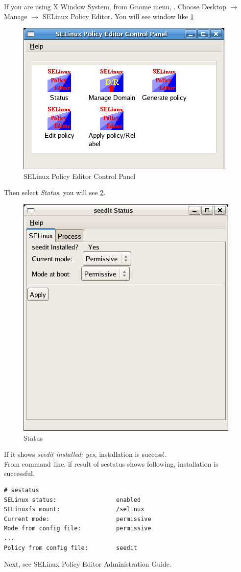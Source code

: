 \documentclass{article}
\begin{document}
If you are using X Window System,  from  Gnome menu, 
. Choose Desktop $\rightarrow$ Manage $\rightarrow$ SELinux
Policy Editor.
You will see window like \ref{fig:controlpanel}
\begin{figure}
\caption{SELinux Policy Editor Control Panel}\label{fig:controlpanel}
\includegraphics*{images/controlpanel.png}
\end{figure}

Then  select {\it Status}, you will see \ref{fig:status-selinux}.
\begin{figure}
\caption{Status}\label{fig:status-selinux}
\includegraphics{images/status-selinux.png}
\end{figure}
If it shows {\it seedit installed: yes}, installation is success!.\\

From command line, if result of sestatus shows following, installation
is successful.
\begin{verbatim}
# sestatus
SELinux status:                 enabled
SELinuxfs mount:                /selinux
Current mode:                   permissive
Mode from config file:          permissive
...
Policy from config file:        seedit	
\end{verbatim}

Next,  see SELinux Policy Editor Administration Guide.
\end{document}
